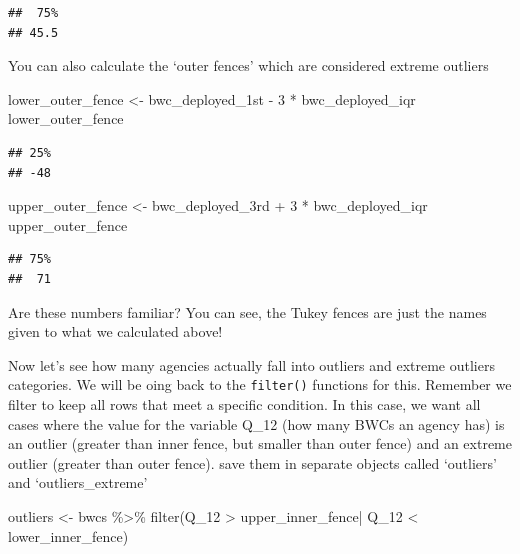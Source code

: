 \documentclass[
]{book}
\newenvironment{Shaded}{\begin{snugshade}}{\end{snugshade}}
\newcommand{\DecValTok}[1]{\textcolor[rgb]{0.00,0.00,0.81}{#1}}
\newcommand{\FunctionTok}[1]{\textcolor[rgb]{0.00,0.00,0.00}{#1}}
\newcommand{\NormalTok}[1]{#1}
\newcommand{\OtherTok}[1]{\textcolor[rgb]{0.56,0.35,0.01}{#1}}
\newcommand{\SpecialCharTok}[1]{\textcolor[rgb]{0.00,0.00,0.00}{#1}}
\begin{document}
\begin{verbatim}
##  75% 
## 45.5
\end{verbatim}

You can also calculate the `outer fences' which are considered extreme outliers

\begin{Shaded}
\begin{Highlighting}[]
\NormalTok{lower\_outer\_fence }\OtherTok{\textless{}{-}}\NormalTok{ bwc\_deployed\_1st }\SpecialCharTok{{-}} \DecValTok{3} \SpecialCharTok{*}\NormalTok{ bwc\_deployed\_iqr }
\NormalTok{lower\_outer\_fence}
\end{Highlighting}
\end{Shaded}

\begin{verbatim}
## 25% 
## -48
\end{verbatim}

\begin{Shaded}
\begin{Highlighting}[]
\NormalTok{upper\_outer\_fence }\OtherTok{\textless{}{-}}\NormalTok{ bwc\_deployed\_3rd }\SpecialCharTok{+} \DecValTok{3} \SpecialCharTok{*}\NormalTok{ bwc\_deployed\_iqr }
\NormalTok{upper\_outer\_fence}
\end{Highlighting}
\end{Shaded}

\begin{verbatim}
## 75% 
##  71
\end{verbatim}

Are these numbers familiar? You can see, the Tukey fences are just the names given to what we calculated above!

Now let's see how many agencies actually fall into outliers and extreme outliers categories. We will be oing back to the \texttt{filter()} functions for this. Remember we filter to keep all rows that meet a specific condition. In this case, we want all cases where the value for the variable Q\_12 (how many BWCs an agency has) is an outlier (greater than inner fence, but smaller than outer fence) and an extreme outlier (greater than outer fence). save them in separate objects called `outliers' and `outliers\_extreme'

\begin{Shaded}
\begin{Highlighting}[]
\NormalTok{outliers }\OtherTok{\textless{}{-}}\NormalTok{ bwcs }\SpecialCharTok{\%\textgreater{}\%} 
  \FunctionTok{filter}\NormalTok{(Q\_12 }\SpecialCharTok{\textgreater{}}\NormalTok{ upper\_inner\_fence}\SpecialCharTok{|}\NormalTok{ Q\_12 }\SpecialCharTok{\textless{}}\NormalTok{ lower\_inner\_fence) }
\end{Highlighting}
\end{Shaded}
\end{document}

